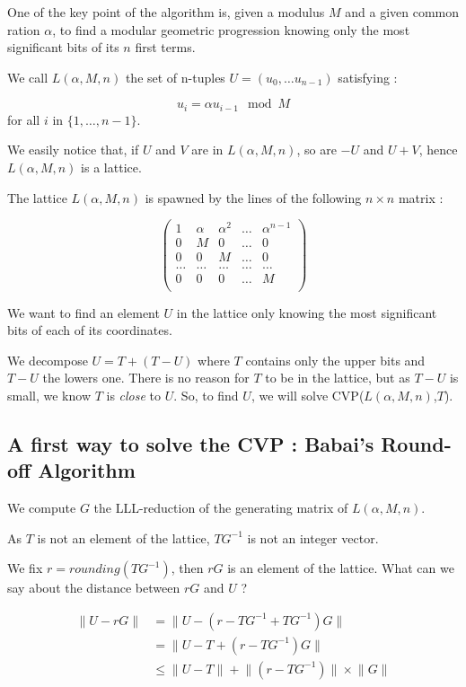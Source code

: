\documentclass[preprint]{iacrtrans}
\begin{document}
One of the key point of the algorithm is, given a modulus \(M\) and a given common ration \(\alpha\), to find a modular geometric progression knowing only the most significant bits of its \(n\) first terms.

We call \(L(\alpha,M,n)\) the set of n-tuples \(U = (u_0,\dots u_{n-1})\) satisfying :

\[u_{i} = \alpha u_{i-1} \mod M \] for all \(i\) in \(\{1,\dots,n-1\}\).


We easily notice that, if \(U\) and \(V\) are in \(L(\alpha,M,n)\), so are \(-U\) and \(U+V\), hence \(L(\alpha,M,n)\) is a lattice.

The lattice \(L(\alpha,M,n)\) is spawned by the lines of the following \(n\times n\) matrix :

\[\begin{pmatrix}
1&\alpha&\alpha^2&\dots&\alpha^{n-1}\\
0&M&0&\dots&0\\
0&0&M&\dots&0\\
\dots&\dots&\dots&\dots&\dots\\
0&0&0&\dots&M\\
\end{pmatrix}\]

We want to find an element \(U\) in the lattice only knowing the most significant bits of each of its coordinates. 


We decompose \(U = T + (T-U)\) where \(T\) contains only the upper bits and \(T-U\) the lowers one. There is no reason for \(T\) to be in the lattice, but as \(T-U\) is small, we know \(T\) is \emph{close} to \(U\). So, to find \(U\), we will solve CVP(\(L(\alpha,M,n)\),\(T\)).

\subsection{A first way to solve the CVP : Babai's Round-off Algorithm}

We compute \(G\) the LLL-reduction of the generating matrix of \(L(\alpha,M,n)\).

As \(T\) is not an element of the lattice, \(TG^{-1}\) is not an integer vector.

We fix \(r = rounding(TG^{-1}) \), then \(rG\) is an element of the lattice. What can we say about the distance between \(rG\) and \(U\) ?

\begin{align*}
\lVert U - rG \rVert &= \lVert U - (r-TG^{-1} + TG^{-1})G \rVert\\
&= \lVert U - T + (r-TG^{-1})G \rVert\\
&\leqslant \lVert U - T \rVert + \lVert(r-TG^{-1})\rVert \times \lVert G\rVert\\	
\end{align*}
\end{document}
